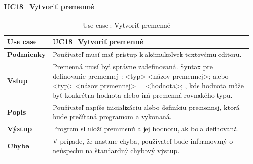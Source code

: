 \paragraph{UC18\_Vytvoriť premenné}
\begin{center}
	\begin{longtable}{|p{2.5cm}|p{12.2cm}|}
		
			\hline
			\textbf{Use case} & UC18\_Vytvoriť premenné \\ 
			\hline
			\textbf{Podmienky} & Používateľ musí mať prístup k akémukoľvek textovému editoru.  \\ 
			\hline
			\textbf{Vstup} & Premenná musí byť správne zadefinovaná. 
			\newline
			Syntax pre definovanie premennej : 
			\newline
			<typ> <názov premennej>; alebo 
			\newline
			 <typ> <názov premennej> = <hodnota>;
			 \newline
			 , kde hodnota môže byť konkrétna hodnota alebo iná premenná rovnakého typu.\\
			\hline
			\textbf{Popis} & Používateľ napíše inicializáciu alebo definíciu premennej, ktorá bude prečítaná programom a vykonaná.\\ 
			\hline
			\textbf{Výstup} & Program si uloží premmenú a jej hodnotu, ak bola definovaná.\\
			\hline
			\textbf{Chyba} & V prípade, že nastane chyba, používateľ bude informovaný o neúspechu na štandardný chybový výstup.\\
			\hline
			\caption{Use case : Vytvoriť premenné}
		\label{table:1}
	
	\end{longtable}
\end{center}
